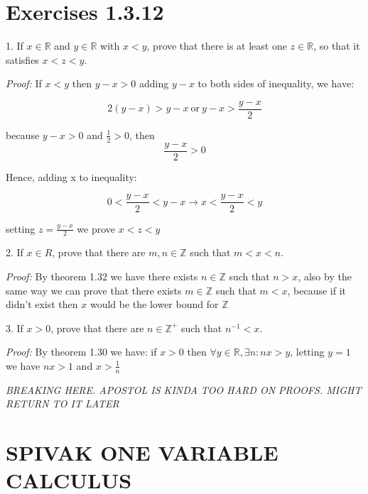 \documentclass[a4paper, 11pt]{article}
\begin{document}
\section*{Exercises 1.3.12}

\hrulefill

1. If $x \in \mathbb{R}$ and $y \in \mathbb{R}$ with $x < y$, prove that there is at least one $z \in \mathbb{R}$, so that it satisfies $x < z < y$.

\emph{Proof:} If $x < y$ then $y - x > 0$ adding $y - x$ to both sides of inequality, we have:

$$2(y - x) > y - x \ \textrm{or} \ y - x > \frac{y - x}{2}$$

because $y - x > 0$ and $\frac{1}{2} > 0$, then 
$$\frac{y - x}{2} > 0$$

Hence, adding x to inequality:

$$0 < \frac{y - x}{2} < y - x \rightarrow x < \frac{y - x}{2} < y$$

setting $z = \frac{y - x}{2}$ we prove $x < z < y$

\hrulefill

2. If $x \in R$, prove that there are $m, n \in \mathbb{Z}$ such that $m < x < n$.

\emph{Proof:} By theorem 1.32 we have there exists $n \in \mathbb{Z}$ such that
$n > x$, also by the same way we can prove that there exists $m \in \mathbb{Z}$
such that $m < x$, because if it didn't exist then $x$ would be the lower bound
for $\mathbb{Z}$

\hrulefill

3. If $x > 0$, prove that there are $n \in \mathbb{Z}^+$ such that $n^{-1} < x$.

\emph{Proof:} By theorem 1.30 we have: if $x > 0$ then $\forall y \in \mathbb{R}, \exists n : nx > y$,
letting $y = 1$ we have $nx > 1$ and $x > \frac{1}{n}$

\hrulefill

\emph{BREAKING HERE. APOSTOL IS KINDA TOO HARD ON PROOFS. MIGHT RETURN TO IT LATER}

\section*{SPIVAK ONE VARIABLE CALCULUS}
\end{document}
